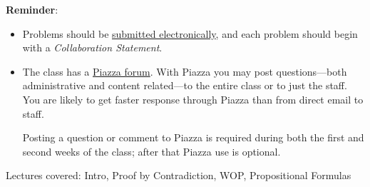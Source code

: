 \documentclass[handout]{mcs}
\begin{document}
\renewcommand{\reading}{ \iffalse
  Part~\bref{part:proofs}{. \emph{Proofs: Introduction}};\fi
\begin{itemize}
\item Chapter~\bref{proofs_chap}{.\ \emph{What is a Proof?}},

\item  Chapter~\bref{well_ordering_chap}{.\ \emph{The Well Ordering
      Principle}} through~\bref{factor_sec}{.\ \emph{Factoring into Primes}}
  (omit~\bref{well_ordering_sec}{.\ \emph{Well Ordered Sets}}),

\item  Chapter~\bref{logicform_chap}{.\ \emph{Logical
      Formulas}} through~\bref{equiv_valid_sec}{.\ \emph{Equivalence and
      Validity}}, and~\bref{SAT_sec}{.\ \emph{The SAT Problem}}\\
  (optional:~\bref{prop_algebra_sec}{.\ \emph{Algebra of
      Propositions}}).
\end{itemize}
These assigned readings do \textbf{not}
  include the Problem sections.  (Many of the problems in the text
  will appear as class or homework problems.)}


\medskip

\textbf{Reminder}:

\begin{itemize}

\item Problems should be
  \href{https://stellar.mit.edu/S/course/6/sp15/6.042/courseMaterial/topics/topic2/syllabus/text3/text}
       {submitted electronically}, and each problem should begin with a \emph{Collaboration Statement}.
\iffalse
\href{http://courses.csail.mit.edu/6.042/spring15/submission.shtml#collab-state}
{\emph{collaboration statement}}
\fi

\item The class has a
  \href{http://piazza.com/mit/spring2015/6042j18062j/home} {Piazza
    forum}.  With Piazza you may post questions---both administrative
  and content related---to the entire class or to just the staff.  You
  are likely to get faster response through Piazza than from direct
  email to staff.

Posting a question or comment to Piazza is required during both the
first and second weeks of the class; after that Piazza use is
optional.
\end{itemize}

\begin{staffnotes}
Lectures covered: Intro, Proof by Contradiction, WOP, Propositional Formulas
\end{staffnotes}
\end{document}
